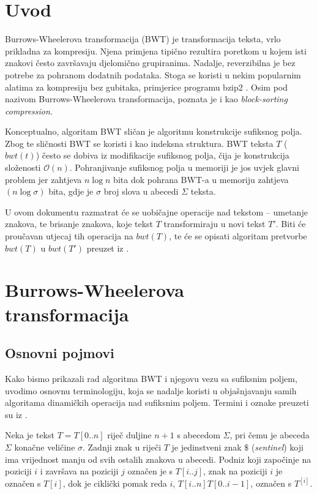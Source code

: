 \documentclass{ferseminar}
\newcommand{\engterm}[1]{\emph{#1}}
\newcommand{\complexity}[1]{$\mathcal{O}(#1)$}
\begin{document}
\stvoripredstranice
\section{Uvod}

Burrows-Wheelerova transformacija (BWT) \citep{burrows1994block} je transformacija teksta, vrlo prikladna za kompresiju. Njena primjena tipično rezultira poretkom u kojem isti znakovi često završavaju djelomično grupiranima. Nadalje, reverzibilna je bez potrebe za pohranom dodatnih podataka. Stoga se koristi u nekim popularnim alatima za kompresiju bez gubitaka, primjerice programu bzip2 \citep{bzip2}. Osim pod nazivom Burrows-Wheelerova transformacija, poznata je i kao \engterm{block-sorting compression}. 

Konceptualno, algoritam BWT sli\v{c}an je algoritmu konstrukcije sufiksnog polja. Zbog te sličnosti BWT se koristi i kao indeksna struktura. BWT teksta $T$ ($bwt(t)$) često se dobiva iz modifikacije sufiksnog polja, \v{c}ija je konstrukcija slo\v{z}enosti \complexity{n}. Pohranjivanje sufiksnog polja u memoriji je jos uvjek glavni problem jer zahtjeva $n\log{}n$ bita dok pohrana BWT-a u memoriju zahtjeva $(n\log{}\sigma)$ bita, gdje je $\sigma$ broj slova u abecedi $\Sigma$ teksta.

U ovom dokumentu razmatrat će se uobičajne operacije nad tekstom -- umetanje znakova, te brisanje znakova, koje tekst $T$ transformiraju u novi tekst $T'$. Biti će proučavan utjecaj tih operacija na $bwt(T)$, te \'{c}e se opisati algoritam pretvorbe $bwt(T)$ u $bwt(T')$ preuzet iz \citep{salson2009four}.

\section{Burrows-Wheelerova transformacija}
\subsection{Osnovni pojmovi}
Kako bismo prikazali rad algoritma BWT i njegovu vezu sa sufiksnim poljem, uvodimo osnovnu terminologiju, koja se nadalje koristi u objašnjavanju samih algoritama dinamičkih operacija nad sufiksnim poljem. Termini i oznake preuzeti su iz \citep{salson2009four}.

Neka je tekst $T=T[0..n]$ riječ duljine $n+1$ s abecedom $\Sigma$, pri čemu je abeceda $\Sigma$ konačne veličine $\sigma$. Zadnji znak u riječi $T$ je jedinstveni znak $\$$ (\engterm{sentinel}) koji ima vrijednost manju od svih ostalih znakova u abecedi.  Podniz koji započinje na poziciji $i$ i završava na poziciji $j$ označen je s $T[i..j]$, znak na poziciji $i$ je označen s $T[i]$, dok je ciklički pomak reda $i$,  $T[i..n]T[0..i-1]$, označen s $T^{[i]}$.
\end{document}
